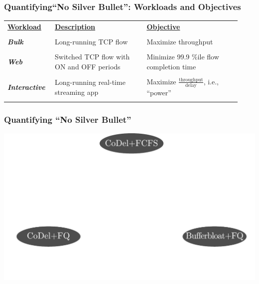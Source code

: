\begin{frame}[plain]
\frametitle{Quantifying``No Silver Bullet'': Workloads and Objectives}

\begin{table}
\begin{tabular}{|p{0.18\linewidth}|p{0.37\linewidth}|p{0.38\linewidth}|}
\hline
{\bf \underline{Workload}} & {\bf \underline{Description}} & {\bf \underline{Objective}} \\
& &\\
\textbf{\emph{Bulk}} & Long-running TCP flow & Maximize throughput \\
& &\\
\textbf{\emph{Web}} & Switched TCP flow with ON and OFF periods &
Minimize 99.9 \%ile flow completion time \\
& &\\
\textbf{\emph{Interactive}} & Long-running real-time
streaming app & Maximize $\frac{\mbox{throughput}}{\mbox{delay}}$, i.e.,
  ``power'' \\ 
& &\\
\hline
\end{tabular}
\end{table}
\end{frame}

\begin{frame}[plain]
\frametitle{Quantifying ``No Silver Bullet''}
\begin{center}
\includegraphics[width=\columnwidth]{fig-6.pdf}
\end{center}
\end{frame}

